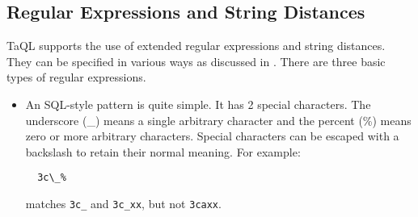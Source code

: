 \subsection{\label{TAQL:REGEX}Regular Expressions and String Distances}
TaQL supports the use of extended regular expressions and string distances. They can be
specified in various ways as discussed in .
There are three basic types of regular expressions.
\begin{itemize}
\item An SQL-style pattern is quite simple. It has 2 special
  characters. The underscore (\_) means a single arbitrary character
  and the percent (\%) means zero or more arbitrary characters.
  Special characters can be escaped with a backslash to retain their
  normal meaning.
  For example:
\begin{verbatim}
  3c\_%
\end{verbatim}
matches \texttt{3c\_} and \texttt{3c\_xx}, but not \texttt{3caxx}.


\end{itemize}
